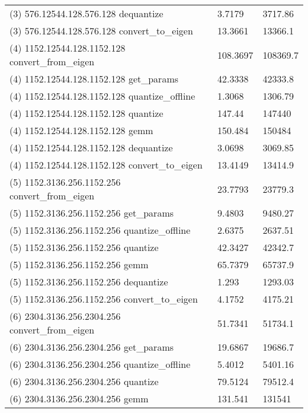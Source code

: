\begin{longtable}{lll}
(3) 576.12544.128.576.128 dequantize             & 3.7179         & 3717.86          \\
(3) 576.12544.128.576.128 convert\_to\_eigen     & 13.3661        & 13366.1          \\
(4) 1152.12544.128.1152.128 convert\_from\_eigen & 108.3697       & 108369.7         \\
(4) 1152.12544.128.1152.128 get\_params          & 42.3338        & 42333.8          \\
(4) 1152.12544.128.1152.128 quantize\_offline    & 1.3068         & 1306.79          \\
(4) 1152.12544.128.1152.128 quantize             & 147.44         & 147440           \\
(4) 1152.12544.128.1152.128 gemm                 & 150.484        & 150484           \\
(4) 1152.12544.128.1152.128 dequantize           & 3.0698         & 3069.85          \\
(4) 1152.12544.128.1152.128 convert\_to\_eigen   & 13.4149        & 13414.9          \\
(5) 1152.3136.256.1152.256 convert\_from\_eigen  & 23.7793        & 23779.3          \\
(5) 1152.3136.256.1152.256 get\_params           & 9.4803         & 9480.27          \\
(5) 1152.3136.256.1152.256 quantize\_offline     & 2.6375         & 2637.51          \\
(5) 1152.3136.256.1152.256 quantize              & 42.3427        & 42342.7          \\
(5) 1152.3136.256.1152.256 gemm                  & 65.7379        & 65737.9          \\
(5) 1152.3136.256.1152.256 dequantize            & 1.293          & 1293.03          \\
(5) 1152.3136.256.1152.256 convert\_to\_eigen    & 4.1752         & 4175.21          \\
(6) 2304.3136.256.2304.256 convert\_from\_eigen  & 51.7341        & 51734.1          \\
(6) 2304.3136.256.2304.256 get\_params           & 19.6867        & 19686.7          \\
(6) 2304.3136.256.2304.256 quantize\_offline     & 5.4012         & 5401.16          \\
(6) 2304.3136.256.2304.256 quantize              & 79.5124        & 79512.4          \\
(6) 2304.3136.256.2304.256 gemm                  & 131.541        & 131541           \\

\end{longtable}
